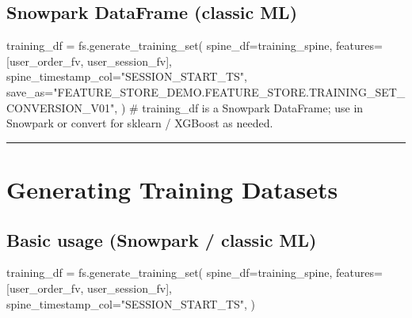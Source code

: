 \documentclass[
  letterpaper,
  DIV=11,
  numbers=noendperiod]{scrreprt}
\newenvironment{Shaded}{\begin{snugshade}}{\end{snugshade}}
\newcommand{\CommentTok}[1]{\textcolor[rgb]{0.37,0.37,0.37}{#1}}
\newcommand{\NormalTok}[1]{\textcolor[rgb]{0.00,0.23,0.31}{#1}}
\newcommand{\OperatorTok}[1]{\textcolor[rgb]{0.37,0.37,0.37}{#1}}
\newcommand{\StringTok}[1]{\textcolor[rgb]{0.13,0.47,0.30}{#1}}
\begin{document}
\hypertarget{snowpark-dataframe-classic-ml}{%
\subsection{Snowpark DataFrame (classic
ML)}\label{snowpark-dataframe-classic-ml}}

\begin{Shaded}
\begin{Highlighting}[]
\NormalTok{training\_df }\OperatorTok{=}\NormalTok{ fs.generate\_training\_set(}
\NormalTok{    spine\_df}\OperatorTok{=}\NormalTok{training\_spine,}
\NormalTok{    features}\OperatorTok{=}\NormalTok{[user\_order\_fv, user\_session\_fv],}
\NormalTok{    spine\_timestamp\_col}\OperatorTok{=}\StringTok{"SESSION\_START\_TS"}\NormalTok{,}
\NormalTok{    save\_as}\OperatorTok{=}\StringTok{"FEATURE\_STORE\_DEMO.FEATURE\_STORE.TRAINING\_SET\_CONVERSION\_V01"}\NormalTok{,}
\NormalTok{)}
\CommentTok{\# training\_df is a Snowpark DataFrame; use in Snowpark or convert for sklearn / XGBoost as needed.}
\end{Highlighting}
\end{Shaded}

\begin{center}\rule{0.5\linewidth}{0.5pt}\end{center}

\hypertarget{generating-training-datasets}{%
\section{Generating Training
Datasets}\label{generating-training-datasets}}

\hypertarget{basic-usage-snowpark-classic-ml}{%
\subsection{Basic usage (Snowpark / classic
ML)}\label{basic-usage-snowpark-classic-ml}}

\begin{Shaded}
\begin{Highlighting}[]
\NormalTok{training\_df }\OperatorTok{=}\NormalTok{ fs.generate\_training\_set(}
\NormalTok{    spine\_df}\OperatorTok{=}\NormalTok{training\_spine,}
\NormalTok{    features}\OperatorTok{=}\NormalTok{[user\_order\_fv, user\_session\_fv],}
\NormalTok{    spine\_timestamp\_col}\OperatorTok{=}\StringTok{"SESSION\_START\_TS"}\NormalTok{,}
\NormalTok{)}
\end{Highlighting}
\end{Shaded}
\end{document}
